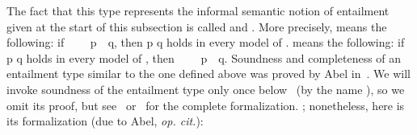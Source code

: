The fact that this type represents the informal semantic notion of entailment
given at the start of this subsection is called  and
.
More precisely,  means the following:
if ~~~~\ab p~~\ab q, then \ab p  \ab q holds in
every model of .
 means the following:
if \ab p  \ab q holds in every model of ,
then ~~~~\ab p~~\ab q.
Soundness and completeness of an entailment type similar to the one defined above was
proved by Abel in~\cite{Abel:2021}.  We will invoke soundness of the entailment type only once below%
\ifshort
~(by the name ), so we omit its proof, but see~\cite{Abel:2021}
or~\cite{DeMeo:2021} for the complete formalization.
\else
; nonetheless, here is its formalization (due to Abel, \textit{op. cit.}):

